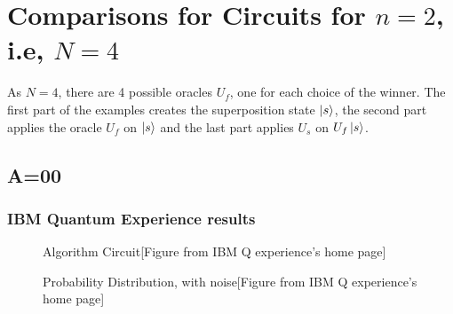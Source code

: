 \documentclass{article}
\begin{document}
\section{Comparisons for Circuits for $n=2$, i.e, $N=4$}
As $N=4$, there are 4 possible oracles $U_f$, one for each choice of the winner. The first part of the examples creates the superposition state $\ket{s}$, the second part applies the oracle $U_f$ on $\ket{s}$ and the last part applies $U_s$ on $U_f \ket{s}$.
\subsection{A=00}
\subsubsection{IBM Quantum Experience results}
\begin{figure}[H]
\centering 
\noindent{}%
\caption{Algorithm Circuit[Figure from IBM Q experience's home page]}
\end{figure}
\begin{figure}[H]
\centering 
\noindent{}%
\caption{Probability Distribution, with noise[Figure from IBM Q experience's home page]}
\end{figure}
\end{document}

